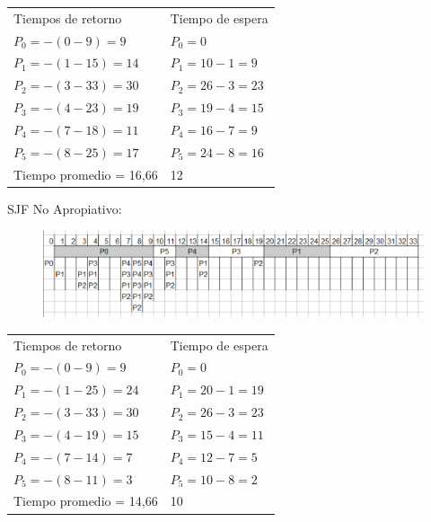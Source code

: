 \documentclass[twoside, a4paper]{article}
\begin{document}
\begin{tabular}{l l}
Tiempos de retorno & Tiempo de espera\\
$P_0 =-(0 - 9)= 9$   & $P_0 = 0$ \\
$P_1 =-(1 - 15)= 14$ & $P_1 = 10-1= 9$ \\
$P_2 =-(3 - 33)= 30$ & $P_2 = 26-3= 23$\\
$P_3 =-(4 - 23)= 19$ & $P_3 = 19-4= 15$\\
$P_4 =-(7 - 18)= 11$ & $P_4 = 16-7= 9$\\
$P_5 =-(8 - 25)= 17$ & $P_5 = 24-8= 16$\\
Tiempo promedio = 16,66 & 12
\end{tabular}
\newline
SJF No Apropiativo:\\
\begin{figure}[!htb]
\includegraphics[scale=0.60]{SJF-noApropiativo.eps}
\end{figure}
\begin{tabular}{l l}
Tiempos de retorno & Tiempo de espera\\
$P_0 =-(0 - 9)= 9$   & $P_0 = 0$ \\
$P_1 =-(1 - 25)= 24$ & $P_1 = 20-1= 19$ \\
$P_2 =-(3 - 33)= 30$ & $P_2 = 26-3= 23$\\
$P_3 =-(4 - 19)= 15$ & $P_3 = 15-4= 11$\\
$P_4 =-(7 - 14)= 7$ & $P_4 = 12-7= 5$\\
$P_5 =-(8 - 11)= 3$ & $P_5 = 10-8= 2$\\
Tiempo promedio = 14,66 & 10
\end{tabular}
\end{document}
